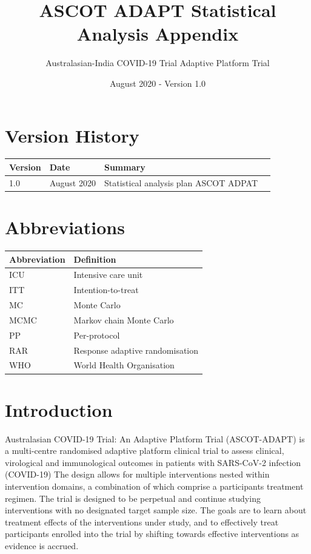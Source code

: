 \documentclass[
  11pt,
]{article}
\title{ASCOT ADAPT Statistical Analysis Appendix}
\subtitle{Australasian-India COVID-19 Trial Adaptive Platform Trial}
\author{}
\date{\vspace{-2.5em}August 2020 - Version 1.0}
\begin{document}
\maketitle

{
\setcounter{tocdepth}{2}
\tableofcontents
}
\hypertarget{version-history}{%
\section*{Version History}\label{version-history}}

\begin{center}
    \begin{tabular}{lllp{5cm}}
    \hline
    Version & Date & Summary \\ \hline
    1.0 & August 2020 & Statistical analysis plan ASCOT ADPAT \\
    \hline
    \end{tabular}
\end{center}

\hypertarget{abbreviations}{%
\section*{Abbreviations}\label{abbreviations}}

\begin{table}[H]
\centering
\begin{tabular}{ll}
\toprule
Abbreviation & Definition\\
\midrule
ICU & Intensive care unit\\
ITT & Intention-to-treat\\
MC & Monte Carlo\\
MCMC & Markov chain Monte Carlo\\
PP & Per-protocol\\
RAR & Response adaptive randomisation\\
WHO & World Health Organisation\\
\bottomrule
\end{tabular}
\end{table}

\clearpage

\hypertarget{introduction}{%
\section{Introduction}\label{introduction}}

Australasian COVID-19 Trial: An Adaptive Platform Trial (ASCOT-ADAPT) is a multi-centre randomised adaptive platform clinical trial to assess clinical, virological and immunological outcomes in patients with SARS-CoV-2 infection (COVID-19)
The design allows for multiple interventions nested within intervention domains, a combination of which comprise a participants treatment regimen.
The trial is designed to be perpetual and continue studying interventions with no designated target sample size.
The goals are to learn about treatment effects of the interventions under study, and to effectively treat participants enrolled into the trial by shifting towards effective interventions as evidence is accrued.
\end{document}
